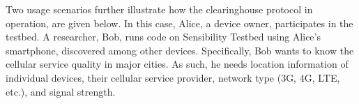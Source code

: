 
Two usage scenarios further illustrate how the clearinghouse 
protocol in operation, are given below. In this case, 
Alice, a device owner, participates in the testbed. A researcher, Bob, 
runs code on Sensibility Testbed using Alice's smartphone, discovered among other
devices. Specifically, Bob wants to know the cellular service
quality in major cities. As such, he needs location information
of individual devices, their cellular service provider, network
type (3G, 4G, LTE, etc.), and signal strength. 

